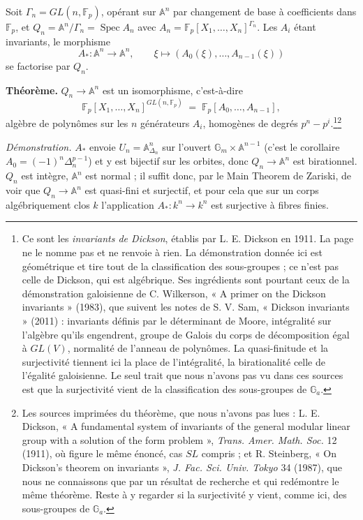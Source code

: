 \documentclass[11pt,a4paper]{article}
\begin{document}
Soit $\Gamma_n = GL(n, \mathbb{F}_p)$, opérant sur $\mathbb{A}^n$ par
changement de base à coefficients dans $\mathbb{F}_p$, et
$Q_n = \mathbb{A}^n/\Gamma_n = \operatorname{Spec} A_n$ avec
$A_n = \mathbb{F}_p[X_1, \dots, X_n]^{\Gamma_n}$. Les $A_i$ étant invariants,
le morphisme
\[
  A_* : \mathbb{A}^n \longrightarrow \mathbb{A}^n, \qquad
  \xi \longmapsto (A_0(\xi), \dots, A_{n-1}(\xi))
\]
se factorise par $Q_n$.

\textbf{Théorème.} $Q_n \to \mathbb{A}^n$ est un isomorphisme,
c'est-à-dire
\[
  \mathbb{F}_p[X_1, \dots, X_n]^{GL(n, \mathbb{F}_p)}
  \;=\; \mathbb{F}_p[A_0, \dots, A_{n-1}] ,
\]
algèbre de polynômes sur les $n$ générateurs $A_i$, homogènes de degrés
$p^n - p^i$.\footnote{Ce sont les \emph{invariants de Dickson}, établis par
L. E. Dickson en 1911. La page ne le nomme pas et ne renvoie à rien. La
démonstration donnée ici est géométrique et tire tout de la classification
des sous-groupes ; ce n'est pas celle de Dickson, qui est algébrique. Ses
ingrédients sont pourtant ceux de la démonstration galoisienne de
C. Wilkerson, « A primer on the Dickson invariants » (1983), que suivent les
notes de S. V. Sam, « Dickson invariants » (2011) : invariants définis par le
déterminant de Moore, intégralité sur l'algèbre qu'ils engendrent, groupe de
Galois du corps de décomposition égal à $GL(V)$, normalité de l'anneau de
polynômes. La quasi-finitude et la surjectivité tiennent ici la place de
l'intégralité, la birationalité celle de l'égalité galoisienne. Le seul trait
que nous n'avons pas vu dans ces sources est que la surjectivité vient de la
classification des sous-groupes de $\mathbb{G}_a$.}\footnote{Les sources
imprimées du théorème, que nous n'avons pas lues : L. E. Dickson,
« A fundamental system of invariants of the general modular linear group with
a solution of the form problem », \emph{Trans. Amer. Math. Soc.} 12 (1911),
où figure le même énoncé, cas $SL$ compris ; et R. Steinberg, « On Dickson's
theorem on invariants », \emph{J. Fac. Sci. Univ. Tokyo} 34 (1987), que nous
ne connaissons que par un résultat de recherche et qui redémontre le même
théorème. Reste à y regarder si la surjectivité y vient, comme ici, des
sous-groupes de $\mathbb{G}_a$.}

\emph{Démonstration.} $A_*$ envoie $U_n = \mathbb{A}^n_{\Delta_n}$ sur
l'ouvert $\mathbb{G}_m \times \mathbb{A}^{n-1}$ (c'est le corollaire
$A_0 = (-1)^n \Delta_n^{p-1}$) et y est bijectif sur les orbites, donc
$Q_n \to \mathbb{A}^n$ est birationnel. $Q_n$ est intègre, $\mathbb{A}^n$ est
normal ; il suffit donc, par le Main Theorem de Zariski, de voir que
$Q_n \to \mathbb{A}^n$ est quasi-fini et surjectif, et pour cela que sur un
corps algébriquement clos $k$ l'application $A_* : k^n \to k^n$ est
surjective à fibres finies.
\end{document}
